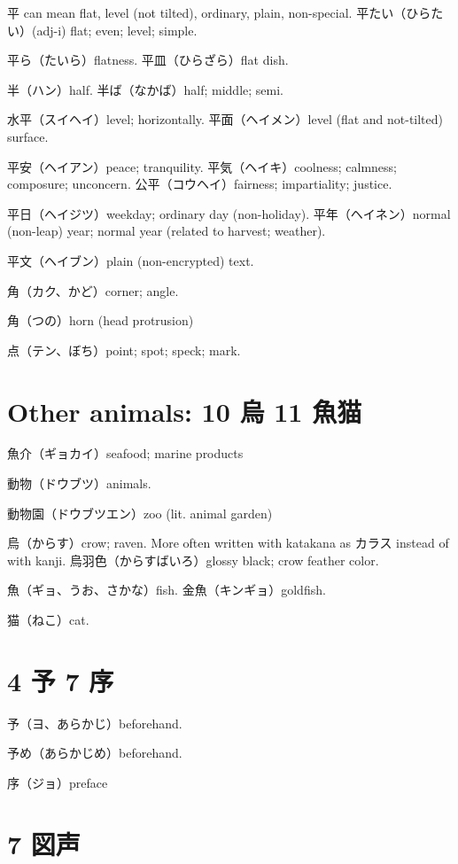 平 can mean flat, level (not tilted), ordinary, plain, non-special.
平たい（ひらたい）(adj-i) flat; even; level; simple.

平ら（たいら）flatness.
平皿（ひらざら）flat dish.

半（ハン）half.
半ば（なかば）half; middle; semi.

水平（スイヘイ）level; horizontally.
平面（ヘイメン）level (flat and not-tilted) surface.

平安（ヘイアン）peace; tranquility.
平気（ヘイキ）coolness; calmness; composure; unconcern.
公平（コウヘイ）fairness; impartiality; justice.

平日（ヘイジツ）weekday; ordinary day (non-holiday).
平年（ヘイネン）normal (non-leap) year; normal year (related to harvest; weather).

平文（ヘイブン）plain (non-encrypted) text.

角（カク、かど）corner; angle.

角（つの）horn (head protrusion)

点（テン、ぼち）point; spot; speck; mark.



\section{Other animals: 10 烏 11 魚猫}

魚介（ギョカイ）seafood; marine products

動物（ドウブツ）animals.

動物園（ドウブツエン）zoo (lit. animal garden)

烏（からす）crow; raven.
More often written with katakana as カラス instead of with kanji.
烏羽色（からすばいろ）glossy black; crow feather color.

魚（ギョ、うお、さかな）fish.
金魚（キンギョ）goldfish.

猫（ねこ）cat.

\section{4 予 7 序}

予（ヨ、あらかじ）beforehand.

予め（あらかじめ）beforehand.

序（ジョ）preface

\section{7 図声}

